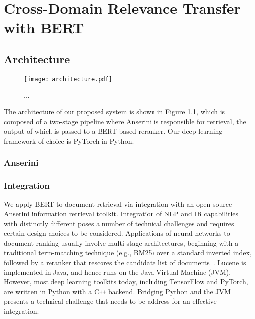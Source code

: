\chapter{Cross-Domain Relevance Transfer with BERT}


\section{Architecture}

\begin{figure}[b!]
\centering
  \texttt{[image: architecture.pdf]}
\caption{...}
\label{fig:arch}
\end{figure}

The architecture of our proposed system is shown in Figure \ref{fig:arch}, which is composed of a two-stage pipeline where Anserini is responsible for retrieval, the output of which is passed to a BERT-based reranker.
Our deep learning framework of choice is PyTorch  in Python.

\subsection{Anserini}




\subsection{Integration}

We apply BERT to document retrieval via integration with an open-source Anserini information retrieval toolkit.
Integration of NLP and IR capabilities with distinctly different  poses a number of technical challenges and requires certain design choices to be considered.
Applications of neural networks to document ranking usually involve multi-stage architectures, beginning with a traditional term-matching technique (e.g., BM25) over a standard inverted index, followed by a reranker that rescores the candidate list of documents~\cite{Asadi_Lin_SIGIR2013}.
Lucene is implemented in Java, and hence runs on the Java Virtual Machine (JVM).
However, most deep learning toolkits today, including TensorFlow and PyTorch, are written in Python with a C\texttt{++} backend.
Bridging Python and the JVM presents a technical challenge that needs to be address for an effective integration.

